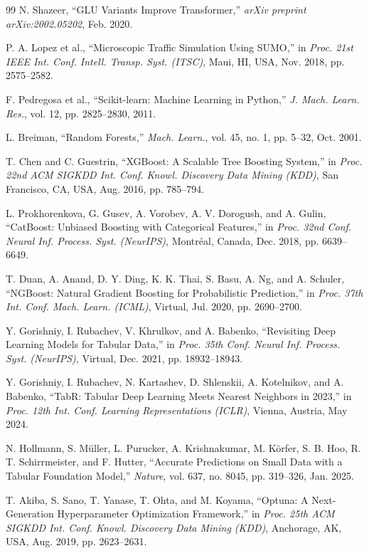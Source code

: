 \documentclass[journal]{IEEEtran}
\begin{document}
\begin{thebibliography}{99}
 N. Shazeer, ``GLU Variants Improve Transformer,'' \emph{arXiv preprint arXiv:2002.05202}, Feb. 2020.

 P. A. Lopez et al., ``Microscopic Traffic Simulation Using SUMO,'' in \emph{Proc. 21st IEEE Int. Conf. Intell. Transp. Syst. (ITSC)}, Maui, HI, USA, Nov. 2018, pp. 2575--2582.

 F. Pedregosa et al., ``Scikit-learn: Machine Learning in Python,'' \emph{J. Mach. Learn. Res.}, vol. 12, pp. 2825--2830, 2011.

 L. Breiman, ``Random Forests,'' \emph{Mach. Learn.}, vol. 45, no. 1, pp. 5--32, Oct. 2001.

 T. Chen and C. Guestrin, ``XGBoost: A Scalable Tree Boosting System,'' in \emph{Proc. 22nd ACM SIGKDD Int. Conf. Knowl. Discovery Data Mining (KDD)}, San Francisco, CA, USA, Aug. 2016, pp. 785--794.

 L. Prokhorenkova, G. Gusev, A. Vorobev, A. V. Dorogush, and A. Gulin, ``CatBoost: Unbiased Boosting with Categorical Features,'' in \emph{Proc. 32nd Conf. Neural Inf. Process. Syst. (NeurIPS)}, Montr\'{e}al, Canada, Dec. 2018, pp. 6639--6649.

 T. Duan, A. Anand, D. Y. Ding, K. K. Thai, S. Basu, A. Ng, and A. Schuler, ``NGBoost: Natural Gradient Boosting for Probabilistic Prediction,'' in \emph{Proc. 37th Int. Conf. Mach. Learn. (ICML)}, Virtual, Jul. 2020, pp. 2690--2700.

 Y. Gorishniy, I. Rubachev, V. Khrulkov, and A. Babenko, ``Revisiting Deep Learning Models for Tabular Data,'' in \emph{Proc. 35th Conf. Neural Inf. Process. Syst. (NeurIPS)}, Virtual, Dec. 2021, pp. 18932--18943.

 Y. Gorishniy, I. Rubachev, N. Kartashev, D. Shlenskii, A. Kotelnikov, and A. Babenko, ``TabR: Tabular Deep Learning Meets Nearest Neighbors in 2023,'' in \emph{Proc. 12th Int. Conf. Learning Representations (ICLR)}, Vienna, Austria, May 2024.

 N. Hollmann, S. M\"{u}ller, L. Purucker, A. Krishnakumar, M. K\"{o}rfer, S. B. Hoo, R. T. Schirrmeister, and F. Hutter, ``Accurate Predictions on Small Data with a Tabular Foundation Model,'' \emph{Nature}, vol. 637, no. 8045, pp. 319--326, Jan. 2025.

 T. Akiba, S. Sano, T. Yanase, T. Ohta, and M. Koyama, ``Optuna: A Next-Generation Hyperparameter Optimization Framework,'' in \emph{Proc. 25th ACM SIGKDD Int. Conf. Knowl. Discovery Data Mining (KDD)}, Anchorage, AK, USA, Aug. 2019, pp. 2623--2631.

\end{thebibliography}
\end{document}
